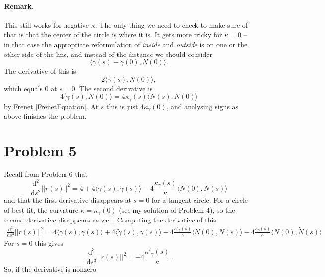 \paragraph{Remark.} This still works for negative \( \kappa \). The only thing we need to check to make sure of that is that the center of the circle is where it is. It gets more tricky for \(\kappa = 0 \) -- in that case the appropriate reformulation of \emph{inside} and \emph{outside} is on one or the other side of the line, and instead of the distance we should consider
\[
\langle \gamma(s) - \gamma(0), N(0) \rangle.
\]
The derivative of this is
\[
2\langle \dot\gamma(s), N(0) \rangle, 
\]
which equals \(0\) at \(s = 0\). The second derivative is
\[
4\langle \ddot \gamma(s), N(0) \rangle = 4\kappa_\gamma(s) \langle N(s), N(0) \rangle
\]
by Frenet \ref{FrenetEquation}. At \(s\) this is just \( 4\kappa_\gamma(0) \), and analysing signs as above finishes the problem.

\section*{Problem 5}

Recall from Problem 6 that
\[
    \frac{\mathrm{d^2}}{\mathrm{d}s^2} \lvert \lvert r(s) \rvert \rvert^2 =  4 + 4\langle \gamma(s), \ddot\gamma(s) \rangle - 4\frac{\kappa_\gamma(s)}{\kappa}\langle N(0), N(s) \rangle
\]
and that the first derivative disappears at \( s = 0 \) for a tangent circle. For a circle of best fit, the curvature \( \kappa = \kappa_\gamma(0) \) (see my solution of Problem 4), so the second derivative disappears as well.
Computing the derivative of this
\begin{align*}
    \frac{\mathrm{d^3}}{\mathrm{d}s^3} \lvert \lvert r(s) \rvert \rvert^2 =  4\langle \gamma(s), \dddot\gamma(s) \rangle + 4\langle \dot\gamma(s), \ddot\gamma(s) \rangle - 4\frac{\kappa'_\gamma(s)}{\kappa}\langle N(0), N(s) \rangle - 4\frac{\kappa_\gamma(s)}{\kappa}\langle N(0), \dot N(s) \rangle
\end{align*}
For \( s = 0 \) this gives
\[
    \frac{\mathrm{d^3}}{\mathrm{d}s^3} \lvert \lvert r(s) \rvert \rvert^2 = -4\frac{\kappa'_\gamma(s)}{\kappa}.
\]
So, if the derivative is nonzero 

